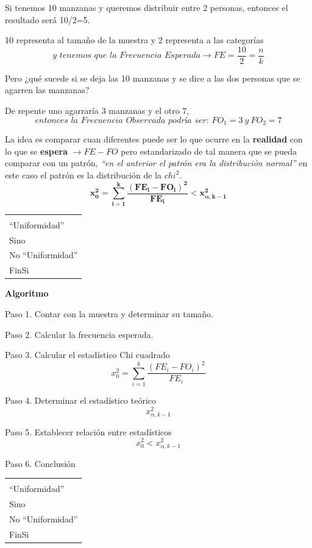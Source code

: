 \documentclass[11pt,letterpaper]{report}
\newenvironment{algoritmo}
  {\begin{center}\begin{tabular}{|p{0.85\textwidth}|}\hline\vspace{-0.2cm}\begin{tabbing}\hspace{0.6cm}\=\hspace{0.6cm}\=\hspace{0.6cm}\=\hspace{0.6cm}\=\hspace{0.6cm}\=\kill}
  {\end{tabbing}\vspace{-0.4cm}\\\hline\end{tabular}\end{center}}
\begin{document}
Si tenemos 10 manzanas y queremos distribuir entre 2 personas, entonces el resultado será 10/2=5.

10 representa al tamaño de la muestra y 2 representa a las categorías
\[
\textit{y tenemos que la Frecuencia Esperada} \rightarrow FE = \frac{10}{2} = \frac{n}{k}
\]

Pero ¿qué sucede si se deja las 10 manzanas y se dice a las dos personas que se agarren las manzanas?

De repente uno agarraría 3 manzanas y el otro 7,
\[
\textit{entonces la Frecuencia Observada podría ser: } FO_1 = 3\ y\ FO_2 = 7
\]

La idea es comparar cuan diferentes puede ser lo que ocurre en la \textbf{realidad} con lo que se \textbf{espera} $\rightarrow FE - FO$ pero estandarizado de tal manera que se pueda comparar con un patrón, {\small\itshape ``en el anterior el patrón era la distribución normal''} en este caso el patrón es la distribución de la $chi^2$.
\[
\boldsymbol{x_0^2 = \sum_{i=1}^{k} \frac{(FE_i - FO_i)^2}{FE_i} < x_{\alpha,k-1}^2}
\]

\begin{algoritmo}
\>Si ($x_0^2 < x_{\alpha,k-1}^2$)\\
\>\>``Uniformidad''\\
\>Sino\\
\>\>No ``Uniformidad''\\
\>FinSi
\end{algoritmo}

\textbf{Algoritmo}

Paso 1. Contar con la muestra y determinar su tamaño.

Paso 2. Calcular la frecuencia esperada.

Paso 3. Calcular el estadístico Chi cuadrado
\[
x_0^2 = \sum_{i=1}^{k} \frac{(FE_i - FO_i)^2}{FE_i}
\]

Paso 4. Determinar el estadístico teórico
\[
x_{\alpha,k-1}^2
\]

Paso 5. Establecer relación entre estadísticos
\[
x_0^2 < x_{\alpha,k-1}^2
\]

Paso 6. Conclusión

\begin{algoritmo}
\>Si ($x_0^2 < x_{\alpha,k-1}^2$)\\
\>\>``Uniformidad''\\
\>Sino\\
\>\>No ``Uniformidad''\\
\>FinSi
\end{algoritmo}
\end{document}

